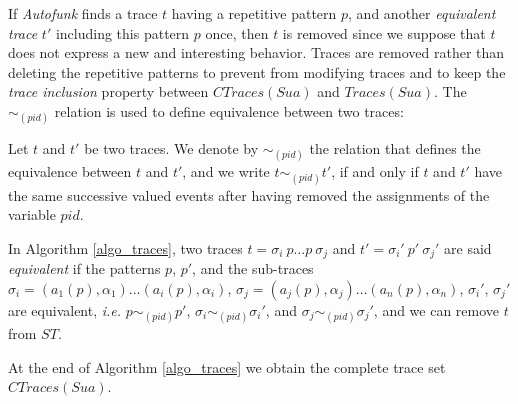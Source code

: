If \emph{Autofunk} finds a trace $t$ having a repetitive pattern
$p$, and another \emph{equivalent trace} $t'$ including this
pattern $p$ once, then $t$ is removed since we suppose that $t$
does not express a new and interesting behavior. Traces are
removed rather than deleting the repetitive patterns to prevent
from modifying traces and to keep the \emph{trace inclusion}
\cite{petrenko06} property between $CTraces(Sua)$ and
$Traces(Sua)$. The $\sim_{(pid)}$ relation is used to define
equivalence between two traces:

\begin{definition}
    Let $t$ and $t'$ be two traces. We denote by $\sim_{(pid)}$
    the relation that defines the equivalence between $t$ and
    $t'$, and we write $t \sim_{(pid)} t'$, if and only if
    $t$ and $t'$ have the same successive valued events after
    having removed the assignments of the variable $pid$.
\end{definition}

In Algorithm \ref{algo_traces}, two traces $t=\sigma_i ~p \dots
p~ \sigma_j$ and $t'=\sigma_i' ~p'~ \sigma_j'$ are said
\emph{equivalent} if the patterns $p$, $p'$, and the sub-traces
$\sigma_i = (a_1(p), \alpha_1) \dots (a_i(p), \alpha_i)$, $\sigma_j =
(a_j(p), \alpha_j) \dots (a_n(p), \alpha_n)$, $\sigma_i'$, $\sigma_j'$ are
equivalent, \emph{i.e.} $p \sim_{(pid)} p'$, $\sigma_i
\sim_{(pid)} \sigma_i'$, and $\sigma_j \sim_{(pid)} \sigma_j'$,
and we can remove $t$ from $ST$.


At the end of Algorithm \ref{algo_traces} we obtain the complete
trace set $CTraces(Sua)$.

